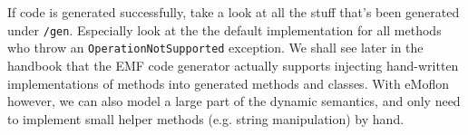 If code is generated successfully, take a look at all the stuff that's been generated under \texttt{/gen}. Especially look at the the default implementation for all methods who throw an  \texttt{OperationNotSupported} exception.
We shall see later in the handbook that the EMF code generator actually supports injecting hand-written implementations of methods into generated methods and classes.
With eMoflon however, we can also model a large part of the dynamic semantics, and only need to implement small helper methods (e.g. string manipulation) by hand.

